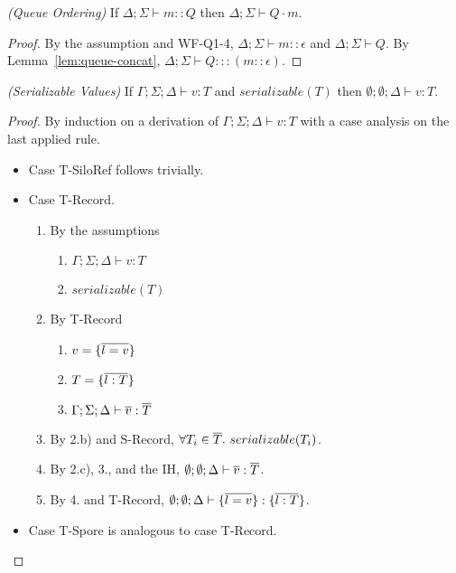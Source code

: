 \begin{thm}
\emph{(Queue Ordering)}\label{lem:queue-ordering}
If $\Delta ; \Sigma \vdash m :: Q$ then $\Delta ; \Sigma \vdash Q \cdot m$.
\end{thm}
\begin{proof}
By the assumption and WF-Q1-4, $\Delta ; \Sigma \vdash m :: \epsilon$ and $\Delta ; \Sigma \vdash Q$. By Lemma~\ref{lem:queue-concat}, $\Delta ; \Sigma \vdash Q ::: (m :: \epsilon)$.
\end{proof}

\begin{thm}
\emph{(Serializable Values)}\label{lem:ser-values}
If $\Gamma ; \Sigma ; \Delta \vdash v : T$ and $serializable(T)$ then $\emptyset ; \emptyset ; \Delta \vdash v : T$.
\end{thm}
\begin{proof}
By induction on a derivation of $\Gamma ; \Sigma ; \Delta \vdash v : T$ with a case analysis on the last applied rule.

\begin{itemize}
\item Case T-SiloRef follows trivially.

\item Case T-Record.
\begin{enumerate}
\item By the assumptions
  \begin{enumerate}[label=(\alph*)]
  \item $\Gamma ; \Sigma ; \Delta \vdash v : T$
  \item $serializable(T)$
  \end{enumerate}
\item By T-Record
  \begin{enumerate}[label=(\alph*)]
  \item $v = \{\overline{l = v}\}$
  \item $T = \{\overline{l : T}\}$
  \item $\Gamma ; \Sigma ; \Delta \vdash \overline{v} : \overline{T}$
  \end{enumerate}
\item By 2.b) and S-Record, $\forall T_i \in \overline{T}.~serializable(T_i)$.
\item By 2.c), 3., and the IH, $\emptyset ; \emptyset ; \Delta \vdash \overline{v} : \overline{T}$.
\item By 4. and T-Record, $\emptyset ; \emptyset ; \Delta \vdash \{\overline{l = v}\} : \{\overline{l : T}\}$.
\end{enumerate}

\item Case T-Spore is analogous to case T-Record.
\end{itemize}
\end{proof}

